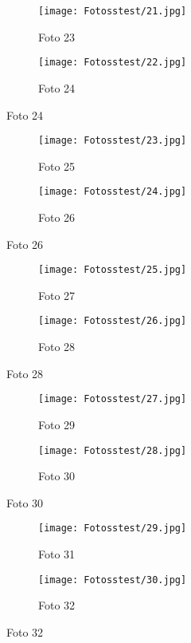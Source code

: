 \documentclass{bachproef-tin}
\begin{document}
\begin{figure}[h]
    \centering
    \begin{subfigure}{0.45\textwidth}
        \centering
        \texttt{[image: Fotosstest/21.jpg]}
        \caption{Foto 23}
    \end{subfigure}%
    \begin{subfigure}{0.45\textwidth}
        \centering
        \texttt{[image: Fotosstest/22.jpg]}
        \caption{Foto 24}
    \end{subfigure}
\end{figure}
\begin{figure}[h]
    \centering
    \begin{subfigure}{0.45\textwidth}
        \centering
        \texttt{[image: Fotosstest/23.jpg]}
        \caption{Foto 25}
    \end{subfigure}%
    \begin{subfigure}{0.45\textwidth}
        \centering
        \texttt{[image: Fotosstest/24.jpg]}
        \caption{Foto 26}
    \end{subfigure}
\end{figure}
\begin{figure}[h]
    \centering
    \begin{subfigure}{0.45\textwidth}
        \centering
        \texttt{[image: Fotosstest/25.jpg]}
        \caption{Foto 27}
    \end{subfigure}%
    \begin{subfigure}{0.45\textwidth}
        \centering
        \texttt{[image: Fotosstest/26.jpg]}
        \caption{Foto 28}
    \end{subfigure}
\end{figure}
\begin{figure}[h]
    \centering
    \begin{subfigure}{0.45\textwidth}
        \centering
        \texttt{[image: Fotosstest/27.jpg]}
        \caption{Foto 29}
    \end{subfigure}%
    \begin{subfigure}{0.45\textwidth}
        \centering
        \texttt{[image: Fotosstest/28.jpg]}
        \caption{Foto 30}
    \end{subfigure}
\end{figure}
\begin{figure}[h]
    \centering
    \begin{subfigure}{0.45\textwidth}
        \centering
        \texttt{[image: Fotosstest/29.jpg]}
        \caption{Foto 31}
    \end{subfigure}%
    \begin{subfigure}{0.45\textwidth}
        \centering
        \texttt{[image: Fotosstest/30.jpg]}
        \caption{Foto 32}
    \end{subfigure}
\end{figure}
\end{document}

